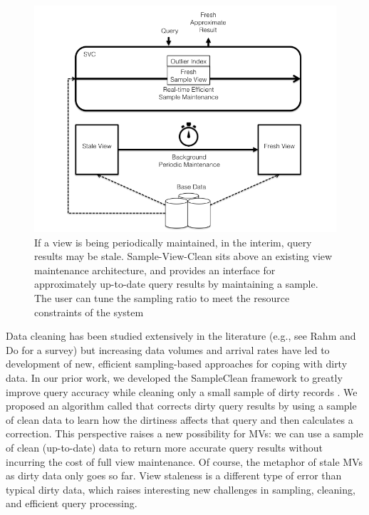 \begin{figure}[t] \vspace{-2em}
\centering
 \includegraphics[scale=0.30]{figs/sys-arch.png} \vspace{-.25em}
 \caption{If a view is being periodically maintained, in the interim, query results may be stale. Sample-View-Clean sits above an existing view maintenance architecture, and provides an interface for approximately up-to-date query results by maintaining a sample. The user can tune the sampling ratio to meet the resource constraints of the system \label{sys-arch}}\vspace{-1.75em}
\end{figure}

Data cleaning has been studied extensively in the literature (e.g., see Rahm and Do for a survey\cite{rahm2000data}) but increasing data volumes and arrival rates have led to development of new, efficient sampling-based approaches for coping with dirty data.   
In our prior work, we developed the SampleClean framework to greatly improve query accuracy while cleaning only a small sample of dirty records \cite{wang1999sample}.  
We proposed an algorithm called \nsc that corrects dirty query results by using a sample of clean data to learn how the dirtiness affects that query and then calculates a correction.  
This perspective raises a new possibility for MVs: we can use a sample of clean (up-to-date) data to return more accurate query results without incurring the cost of full view maintenance.
Of course, the metaphor of stale MVs as dirty data only goes so far. 
View staleness is a different type of error than typical dirty data, which raises interesting new challenges in sampling, cleaning, and efficient query processing.

